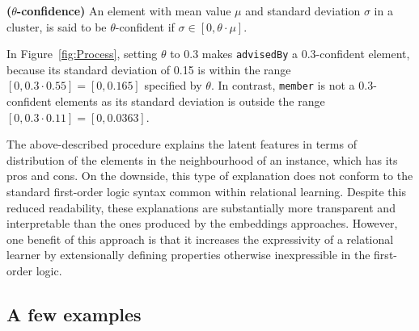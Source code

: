 \begin{definition}{\textbf{($\theta$-confidence)}}
An element with mean value $\mu$ and standard deviation $\sigma$  in a cluster,  is said to be $\theta$-confident if $\sigma \in [0, \theta \cdot \mu]$.
\end{definition}
 
In Figure~\ref{fig:Process}, setting $\theta$ to 0.3 makes \texttt{advisedBy} a $0.3$-confident element, because its standard deviation of 0.15 is within the range $[0, 0.3 \cdot 0.55] = [0, 0.165]$ specified by $\theta$.
In contrast, \texttt{member} is not a $0.3$-confident elements as its standard deviation is outside the range $[0, 0.3 \cdot 0.11] = [0, 0.0363]$.


The above-described procedure explains the latent features in terms of distribution of the elements in the neighbourhood of an instance, which has its pros and cons.
On the downside, this type of explanation does not conform to the standard first-order logic syntax common within relational learning.
Despite this reduced readability, these explanations are substantially more transparent and interpretable than the ones produced by the embeddings approaches.
However, one benefit of this approach is that it increases the expressivity of a relational learner by extensionally defining  properties otherwise inexpressible in the first-order logic.


\subsection{A few examples}







